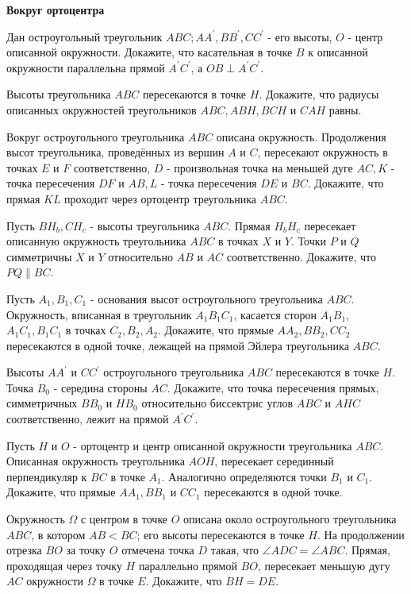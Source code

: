 \centerline{\bf \Huge Вокруг ортоцентра}

Дан остроугольный треугольник $A B C ; A A^{\prime}, B B^{\prime}, C C^{\prime}$ - его высоты, $O$ - центр описанной окружности. Докажите, что касательная в точке $B$ к описанной окружности параллельна прямой $A^{\prime} C^{\prime}$, а $O B \perp A^{\prime} C^{\prime}$.

Высоты треугольника $A B C$ пересекаются в точке $H$. Докажите, что радиусы описанных окружностей треугольников $A B C, A B H, B C H$ и $C A H$ равны.

Вокруг остроугольного треугольника $A B C$ описана окружность. Продолжения высот треугольника, проведённых из вершин $A$ и $C$, пересекают окружность в точках $E$ и $F$ соответственно, $D$ - произвольная точка на меньшей дуге $A C, K$ - точка пересечения $D F$ и $A B, L$ - точка пересечения $D E$ и $B C$. Докажите, что прямая $K L$ проходит через ортоцентр треугольника $A B C$.

Пусть $B H_b, C H_c$ - высоты треугольника $A B C$. Прямая $H_b H_c$ пересекает описанную окружность треугольника $A B C$ в точках $X$ и $Y$. Точки $P$ и $Q$ симметричны $X$ и $Y$ относительно $A B$ и $A C$ соответственно. Докажите, что $P Q \| B C$.

Пусть $A_1, B_1, C_1$ - основания высот остроугольного треугольника $A B C$. Окружность, вписанная в треугольник $A_1 B_1 C_1$, касается сторон $A_1 B_1$, $A_1 C_1, B_1 C_1$ в точках $C_2, B_2, A_2$. Докажите, что прямые $A A_2, B B_2, C C_2$ пересекаются в одной точке, лежащей на прямой Эйлера треугольника $A B C$.


Высоты $A A^{\prime}$ и $C C^{\prime}$ остроугольного треугольника $A B C$ пересекаются в точке $H$. Точка $B_0$ - середина стороны $A C$. Докажите, что точка пересечения прямых, симметричных $B B_0$ и $H B_0$ относительно биссектрис углов $A B C$ и $A H C$ соответственно, лежит на прямой $A^{\prime} C^{\prime}$.

Пусть $H$ и $O$ - ортоцентр и центр описанной окружности треугольника $A B C$. Описанная окружность треугольника $A O H$, пересекает серединный перпендикуляр к $B C$ в точке $A_1$. Аналогично определяются точки $B_1$ и $C_1$. Докажите, что прямые $A A_1, B B_1$ и $C C_1$ пересекаются в одной точке.

Окружность $\Omega$ с центром в точке $O$ описана около остроугольного треугольника $A B C$, в котором $A B<B C$; его высоты пересекаются в точке $H$. На продолжении отрезка $B O$ за точку $O$ отмечена точка $D$ такая, что $\angle A D C=\angle A B C$. Прямая, проходящая через точку $H$ параллельно прямой $B O$, пересекает меньшую дугу $A C$ окружности $\Omega$ в точке $E$. Докажите, что $B H=D E$.

